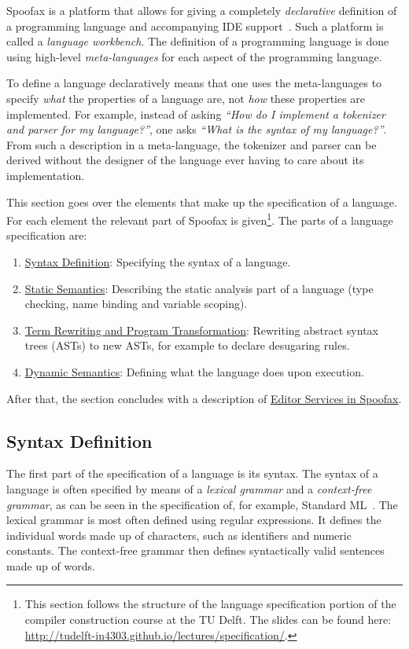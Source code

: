 Spoofax is a platform that allows for giving a completely
\emph{declarative} definition of a programming language and accompanying
IDE support~\cite{Kats10a}. Such a platform is called a \emph{language
workbench}. The definition of a programming language is done using
high-level \emph{meta-languages} for each aspect of the programming
language.

To define a language declaratively means that one uses the
meta-languages to specify \emph{what} the properties of a language are, not
\emph{how} these properties are implemented. For example, instead of asking
\emph{​``How do I implement a tokenizer and parser for my language?''​}, one
asks \emph{​``What is the syntax of my language?''​}. From such a description
in a meta-language, the tokenizer and parser can be derived without
the designer of the language ever having to care about its
implementation.

This section goes over the elements that make up the specification of
a language. For each element the relevant part of Spoofax is
given\footnote{This section follows the structure of the
language specification portion of the compiler construction course at
the TU Delft. The slides can be found here:
\url{http://tudelft-in4303.github.io/lectures/specification/}.}. The parts
of a language specification are:

\begin{enumerate}
\item \hyperref[sec:syntax-def]{Syntax Definition}: Specifying the syntax of a language.
\item \hyperref[sec:static-analysis]{Static Semantics}: Describing the static analysis part of a
language (type checking, name binding and variable scoping).
\item \hyperref[sec:term-rewrite]{Term Rewriting and Program Transformation}: Rewriting abstract
syntax trees (ASTs) to new ASTs, for example to declare desugaring
rules.
\item \hyperref[sec:dynamic-semantics]{Dynamic Semantics}: Defining what the language does upon execution.
\end{enumerate}

After that, the section concludes with a description of \hyperref[sec:editor-serv]{Editor
Services in Spoofax}.
\subsection{Syntax Definition}
\label{sec:syntax-def}
The first part of the specification of a language is its syntax. The
syntax of a language is often specified by means of a \emph{lexical
grammar} and a \emph{context-free grammar}, as can be seen in the
specification of, for example, Standard ML~\cite{Milner97}. The
lexical grammar is most often defined using regular expressions. It
defines the individual words made up of characters, such as
identifiers and numeric constants. The context-free grammar then
defines syntactically valid sentences made up of words.

